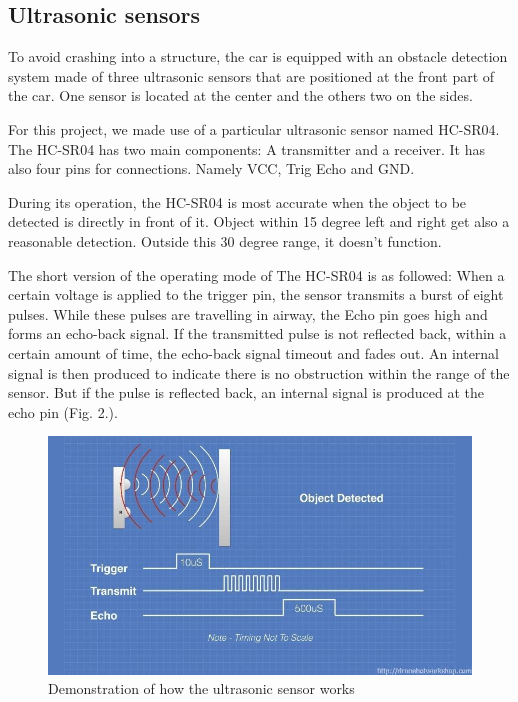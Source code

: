 \documentclass[conference]{IEEEtran}
\begin{document}
\subsection{Ultrasonic sensors}
To avoid crashing into a structure, the car is equipped with an obstacle detection system made of three ultrasonic sensors that are positioned at the front part of the car. One sensor is located at the center and the others two on the sides.

For this project, we made use of a particular ultrasonic sensor named HC-SR04. The HC-SR04 has two main components: A transmitter and a receiver. It has also four pins for connections. Namely VCC, Trig Echo and GND.

During its operation, the HC-SR04 is most accurate when the object to be detected is directly in front of it. Object within 15 degree left and right get also a reasonable detection.  Outside this 30 degree range, it doesn't function.

The short version of the operating mode of The HC-SR04 is as followed: 
When a certain voltage is applied to the trigger pin, the sensor transmits a burst of eight pulses. While these pulses are travelling in airway, the Echo pin goes high and forms an echo-back signal.
If the transmitted pulse is not reflected back, within a certain amount of time, the echo-back signal timeout and fades out. An internal signal is then produced to indicate there is no obstruction within the range of the sensor. 
But if the pulse is reflected back, an internal signal is produced at the echo pin (Fig. 2.). 
\begin{figure}[h!]
	\includegraphics[width=\linewidth]{USSin.jpg}
	\caption{Demonstration of how the ultrasonic sensor works}
	\label{fig:UMLSM1}
\end{figure}
\end{document}
